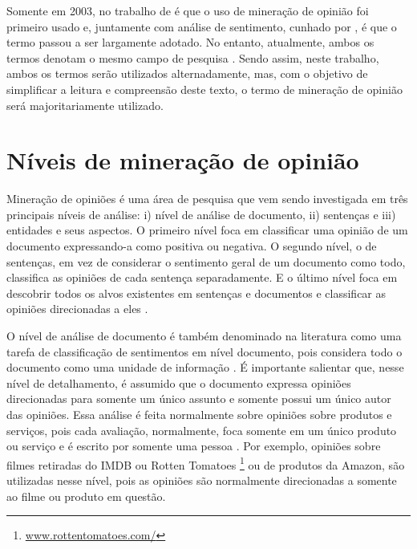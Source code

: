 \documentclass[template.tex]{subfiles}
\begin{document}
Somente em 2003, no trabalho de  é que o uso de mineração de opinião foi primeiro usado e, juntamente com análise de sentimento, cunhado por , é que o termo passou a ser largamente adotado. No entanto, atualmente, ambos os termos denotam o mesmo campo de pesquisa \cite{bing:2012, pang:2008}. Sendo assim, neste trabalho, ambos os termos serão utilizados alternadamente, mas, com o objetivo de simplificar a leitura e compreensão deste texto, o termo de mineração de opinião será majoritariamente utilizado.

\section{Níveis de mineração de opinião}


Mineração de opiniões é uma área de pesquisa que vem sendo investigada em três principais níveis de análise: i) nível de análise de documento, ii) sentenças e iii) entidades e seus aspectos. O primeiro nível foca em classificar uma opinião de um documento expressando-a como positiva ou negativa. O segundo nível, o de sentenças, em vez de considerar o sentimento geral de um documento como todo, classifica as opiniões de cada sentença separadamente. E o último nível foca em descobrir todos os alvos existentes em sentenças e documentos e classificar as opiniões direcionadas a eles \cite{bing:2012}.

O nível de análise de documento é também denominado na literatura como uma tarefa de classificação de sentimentos em nível documento, pois considera todo o documento como uma unidade de informação \cite{bing:2012, pang:2008}. É importante salientar que, nesse nível de detalhamento, é assumido que o documento expressa opiniões direcionadas para somente um único assunto e somente possui um único autor das opiniões. Essa análise é feita normalmente sobre opiniões sobre produtos e serviços, pois cada avaliação, normalmente, foca somente em um único produto ou serviço e é escrito por somente uma pessoa \cite{bing:2012}. Por exemplo, opiniões sobre filmes retiradas do IMDB ou Rotten Tomatoes \footnote{\url{www.rottentomatoes.com/}} ou de produtos da Amazon, são utilizadas nesse nível, pois as opiniões são normalmente direcionadas a somente ao filme ou produto em questão. 
\end{document}
